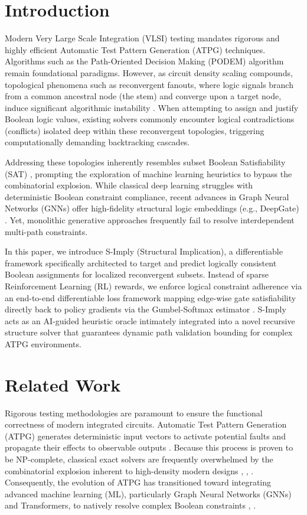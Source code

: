 \documentclass[conference]{IEEEtran}
\begin{document}
\section{Introduction}
Modern Very Large Scale Integration (VLSI) testing mandates rigorous and highly efficient Automatic Test Pattern Generation (ATPG) techniques. Algorithms such as the Path-Oriented Decision Making (PODEM) algorithm \cite{goel1981implicit} remain foundational paradigms. However, as circuit density scaling compounds, topological phenomena such as reconvergent fanouts, where logic signals branch from a common ancestral node (the stem) and converge upon a target node, induce significant algorithmic instability \cite{maamari1990fault}. When attempting to assign and justify Boolean logic values, existing solvers commonly encounter logical contradictions (conflicts) isolated deep within these reconvergent topologies, triggering computationally demanding backtracking cascades.

Addressing these topologies inherently resembles subset Boolean Satisfiability (SAT) \cite{marques1999grasp}, prompting the exploration of machine learning heuristics to bypass the combinatorial explosion. While classical deep learning struggles with deterministic Boolean constraint compliance, recent advances in Graph Neural Networks (GNNs) offer high-fidelity structural logic embeddings (e.g., DeepGate) \cite{deepgate}. Yet, monolithic generative approaches frequently fail to resolve interdependent multi-path constraints.

In this paper, we introduce S-Imply (Structural Implication), a differentiable framework specifically architected to target and predict logically consistent Boolean assignments for localized reconvergent subsets. Instead of sparse Reinforcement Learning (RL) rewards, we enforce logical constraint adherence via an end-to-end differentiable loss framework mapping edge-wise gate satisfiability directly back to policy gradients via the Gumbel-Softmax estimator \cite{jang2016categorical}. S-Imply acts as an AI-guided heuristic oracle intimately integrated into a novel recursive structure solver that guarantees dynamic path validation bounding for complex ATPG environments.

\section{Related Work}

Rigorous testing methodologies are paramount to ensure the functional correctness of modern integrated circuits. Automatic Test Pattern Generation (ATPG) generates deterministic input vectors to activate potential faults and propagate their effects to observable outputs \cite{bushnell2000essentials}. Because this process is proven to be NP-complete, classical exact solvers are frequently overwhelmed by the combinatorial explosion inherent to high-density modern designs \cite{roy2020machine}, \cite{inf-atpg-rl}, \cite{stephan1996combinational}. Consequently, the evolution of ATPG has transitioned toward integrating advanced machine learning (ML), particularly Graph Neural Networks (GNNs) and Transformers, to natively resolve complex Boolean constraints \cite{deepgate3-arxiv}, \cite{circuit-transformer-iclr}.
\end{document}
